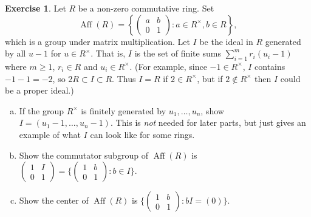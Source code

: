 \documentclass[10pt]{article}
\newcommand{\Aff}{\operatorname{Aff}}
\theoremstyle{Theorem}
\theoremstyle{definition}
\newtheorem{exe}{Exercise}
\theoremstyle{remark}
\theoremstyle{custom}
\begin{document}
\begin{exe} 
Let $R$ be a non-zero commutative ring.  Set 
$$
\Aff(R) = \left\{\left(\begin{array}{cc}a&b\\0&1\end{array}\right) : a \in R^\times, b \in R\right\}, 
$$
which is a group under matrix multiplication.  Let $I$ be the ideal in $R$ generated by 
all $u - 1$ for $u \in R^\times$.  That is, $I$ is the set of finite sums $\sum_{i=1}^m r_i(u_i-1)$ 
where $m \geq 1$, $r_i \in R$ and $u_i \in R^\times$.
(For example, since $-1 \in R^\times$, $I$ contains $-1-1= -2$, so 
$2R \subset I \subset R$.  Thus $I = R$ if $2 \in R^\times$, but if $2 \not\in R^\times$ then $I$ could be 
a proper ideal.)
\begin{enumerate}[(a)]
\item If the group $R^\times$ is finitely generated by $u_1, \dots, u_n$, show 
$I = (u_1 - 1, \dots, u_n - 1)$.  This is {\it not} needed for later parts, but just 
gives an example of what $I$ can look like for some rings. 



\item Show the commutator subgroup of $\Aff(R)$ is $(\begin{smallmatrix}1&I\\0&1\end{smallmatrix}) = 
\{(\begin{smallmatrix}1&b\\0&1\end{smallmatrix}) : b \in I\}$. 

\item Show the center of $\Aff(R)$ is $\{(\begin{smallmatrix}1&b\\0&1\end{smallmatrix}) : bI = (0)\}$.
\end{enumerate} 
\end{exe} 
\end{document}
